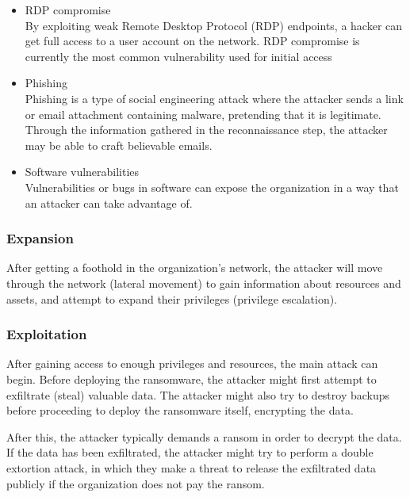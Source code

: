 \begin{itemize}
    \item RDP compromise \\
    By exploiting weak Remote Desktop Protocol (RDP) endpoints,
    a hacker can get full access to a user account on the network.
    RDP compromise is currently the most common 
    vulnerability used for initial access \cite{noauthor_remote_nodate, may_29_top_nodate}
    
    \item Phishing \\
    Phishing is a type of social engineering attack where the attacker
    sends a link or email attachment containing malware,
    pretending that it is legitimate.
    Through the information gathered in the reconnaissance step,
    the attacker may be able to craft believable emails.
    
    \item Software vulnerabilities \\
    Vulnerabilities or bugs in software can expose the organization
    in a way that an attacker can take advantage of.
\end{itemize}

\subsubsection{Expansion}

After getting a foothold in the organization's network,
the attacker will move through the network (lateral movement)
to gain information about resources and assets,
and attempt to expand their privileges (privilege escalation).

\subsubsection{Exploitation}

After gaining access to enough privileges and resources, the main attack can begin.
Before deploying the ransomware,
the attacker might first attempt to exfiltrate (steal) valuable data.
The attacker might also try to destroy backups before
proceeding to deploy the ransomware itself, encrypting the data.

After this, the attacker typically demands a ransom in order to decrypt the data.
If the data has been exfiltrated,
the attacker might try to perform a double extortion attack,
in which they make a threat to release the exfiltrated data publicly
if the organization does not pay the ransom.

